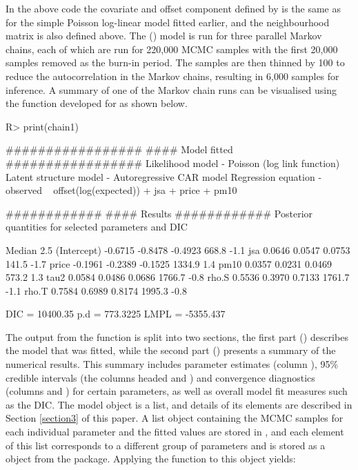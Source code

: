 \documentclass[article, nojss]{jss}
\begin{document}
In the above code the covariate and offset component defined by  is the same as for the simple Poisson log-linear model fitted earlier, and the neighbourhood matrix   is also defined above. The () model is run for three parallel Markov chains, each of which  are run for 220,000 MCMC samples with the first 20,000 samples removed as the burn-in period. The samples are then thinned by 100 to reduce the autocorrelation in the Markov chains, resulting in 6,000 samples for inference. A summary of one of the Markov chain runs can be visualised using the  function developed for  as shown below.

\begin{CodeInput}
R>  print(chain1)
\end{CodeInput}


\begin{CodeOutput}
#################
#### Model fitted
#################
Likelihood model - Poisson (log link function) 
Latent structure model - Autoregressive CAR model
Regression equation - observed ~ offset(log(expected)) + jsa + price + pm10

############
#### Results
############
Posterior quantities for selected parameters and DIC

             Median    2.5%
(Intercept) -0.6715 -0.8478 -0.4923       668.8        -1.1
jsa          0.0646  0.0547  0.0753       141.5        -1.7
price       -0.1961 -0.2389 -0.1525      1334.9         1.4
pm10         0.0357  0.0231  0.0469       573.2         1.3
tau2         0.0584  0.0486  0.0686      1766.7        -0.8
rho.S        0.5536  0.3970  0.7133      1761.7        -1.1
rho.T        0.7584  0.6989  0.8174      1995.3        -0.8

DIC =  10400.35       p.d =  773.3225       LMPL =  -5355.437 \end{CodeOutput}


The output from the  function is split into two sections, the first part () describes the model that was fitted, while the second part () presents  a summary of the numerical results. This summary includes parameter estimates (column ), 95\% credible intervals (the columns headed  and ) and convergence diagnostics (columns  and ) for certain parameters, as well as overall model fit measures such as the DIC. The model object  is a list, and details of its elements are described in Section \ref{section3} of this paper. A list object containing the MCMC samples for each individual parameter and the fitted values are stored in , and each element of this list corresponds to a different group of parameters and is stored as a   object from the  package.  Applying the  function to this object yields:
\end{document}
